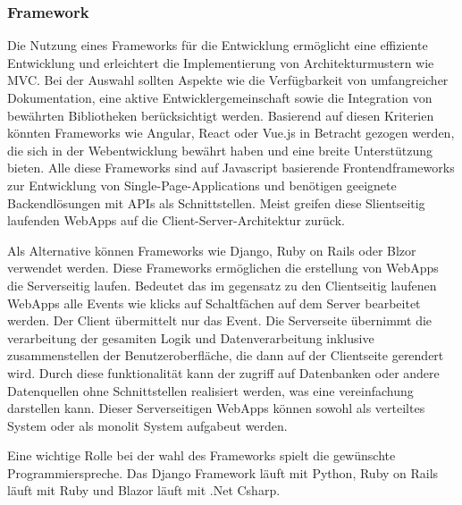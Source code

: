 \subsubsection{Framework}
\label{sec:Framework}
Die Nutzung eines Frameworks für die Entwicklung ermöglicht eine effiziente Entwicklung und erleichtert die Implementierung von Architekturmustern wie \zB MVC. Bei der Auswahl sollten Aspekte wie die Verfügbarkeit von umfangreicher Dokumentation, eine aktive Entwicklergemeinschaft sowie die Integration von bewährten Bibliotheken berücksichtigt werden. Basierend auf diesen Kriterien könnten Frameworks wie Angular, React oder Vue.js in Betracht gezogen werden, die sich in der Webentwicklung bewährt haben und eine breite Unterstützung bieten. Alle diese Frameworks sind auf Javascript basierende Frontendframeworks zur Entwicklung von Single-Page-Applications und benötigen geeignete Backendlösungen mit APIs als Schnittstellen. Meist greifen diese Slientseitig laufenden WebApps auf die Client-Server-Architektur zurück. %

Als Alternative können Frameworks wie Django, Ruby on Rails oder Blzor verwendet werden. Diese Frameworks ermöglichen die erstellung von WebApps die Serverseitig laufen. Bedeutet das im gegensatz zu den Clientseitig laufenen WebApps alle Events wie \zB klicks auf Schaltfächen auf dem Server bearbeitet werden. Der Client übermittelt nur das Event. Die Serverseite übernimmt die verarbeitung der gesamiten Logik und Datenverarbeitung inklusive zusammenstellen der Benutzeroberfläche, die dann auf der Clientseite gerendert wird. Durch diese funktionalität kann der zugriff auf Datenbanken oder andere Datenquellen ohne Schnittstellen realisiert werden, was eine vereinfachung darstellen kann. Dieser Serverseitigen WebApps können sowohl als verteiltes System oder als monolit System aufgabeut werden.

Eine wichtige Rolle bei der wahl des Frameworks spielt die gewünschte Programmierspreche. Das Django Framework läuft mit Python, Ruby on Rails läuft mit Ruby und Blazor läuft mit .Net \bzw Csharp.  
